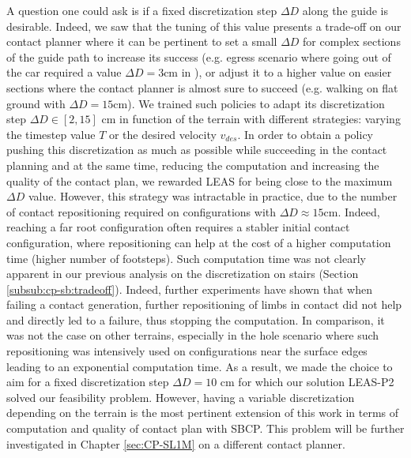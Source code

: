 A question one could ask is if a fixed discretization step $\Delta D$ along the guide is desirable. 
Indeed, we saw that the tuning of this value presents a trade-off on our contact planner where it can be pertinent to set a small $\Delta D$ for complex sections of the guide path to increase its success (e.g. egress scenario where going out of the car required a value $\Delta D=3$cm in \cite{AcyclicCP}), or adjust it to a higher value on easier sections where the contact planner is almost sure to succeed (e.g. walking on flat ground with $\Delta D=15$cm).
We trained such policies to adapt its discretization step $\Delta D \in [2,15]$ cm in function of the terrain with different strategies: varying the timestep value $T$ or the desired velocity $v_{des}$.
In order to obtain a policy pushing this discretization as much as possible while succeeding in the contact planning and at the same time, reducing the computation and increasing the quality of the contact plan, we rewarded LEAS for being close to the maximum $\Delta D$ value.
However, this strategy was intractable in practice, due to the number of contact repositioning required on configurations with $\Delta D \approx 15$cm.  Indeed, reaching a far root configuration often requires a stabler initial contact configuration, where repositioning can help at the cost of a higher computation time (higher number of footsteps).
Such computation time was not clearly apparent in our previous analysis on the discretization on stairs (Section \ref{subsub:cp-sb:tradeoff}). Indeed, further experiments have shown that when failing a contact generation, further repositioning of limbs in contact did not help and directly led to a failure, thus stopping the computation.
In comparison, it was not the case on other terrains, especially in the hole scenario where such repositioning was intensively used on configurations near the surface edges leading to an exponential computation time.
As a result, we made the choice to aim for a fixed discretization step $\Delta D=10$ cm for which our solution LEAS-P2 solved our feasibility problem.
However, having a variable discretization depending on the terrain is the most pertinent extension of this work in terms of computation and quality of contact plan with SBCP.
This problem will be further investigated in Chapter \ref{sec:CP-SL1M} on a different contact planner.


